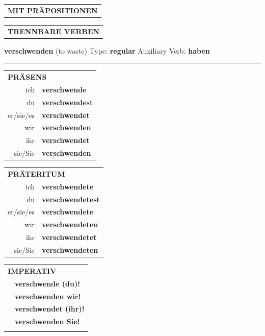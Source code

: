 \documentclass[10pt,a4paper]{revtex4-2}
\begin{document}
\begin{verbbox}
\vspace{10pt}

\begin{tabular}{lll}
\multicolumn{3}{l}{\textbf{MIT PRÄPOSITIONEN}}\\
\end{tabular}
\hfill
\begin{tabular}{lll}
\multicolumn{3}{l}{\textbf{TRENNBARE VERBEN}}\\
\end{tabular}
\vspace{-5pt}
\end{verbbox}

\begin{verbbox}
    {\Large \bf verschwenden} (to waste) \hfill Type: \textbf{regular} \hfill Auxiliary Verb: \textbf{haben} 
    
     \vspace{5pt}

    \hrule
    
    \vspace{5pt}

  \begin{tabular}{rl}
     \multicolumn{2}{l}{\textbf{PRÄSENS} }\\
    ich & \textbf{verschwende}\\
    du & \textbf{verschwendest}\\
    er/sie/es & \textbf{verschwendet}\\
    wir & \textbf{verschwenden}\\
    ihr & \textbf{verschwendet}\\
    sie/Sie & \textbf{verschwenden}\\
  \end{tabular}
  \hfill
     \begin{tabular}{rl}
    \multicolumn{2}{l}{\textbf{PRÄTERITUM} }\\
    ich & \textbf{verschwendete}\\
    du & \textbf{verschwendetest}\\
    er/sie/es & \textbf{verschwendete}\\
    wir & \textbf{verschwendeten}\\
    ihr & \textbf{verschwendetet}\\
    sie/Sie & \textbf{verschwendeten}\\
  \end{tabular}
  \hfill
  \begin{tabular}{rl}
     \multicolumn{2}{l}{\textbf{IMPERATIV} }\\
   & \textbf{verschwende (du)!}\\
   & \textbf{verschwenden wir!}\\
   & \textbf{verschwendet (ihr)!}\\
   & \textbf{verschwenden Sie!}\\
   & \vspace{10pt}
  \end{tabular}


\end{verbbox}
\end{document}
